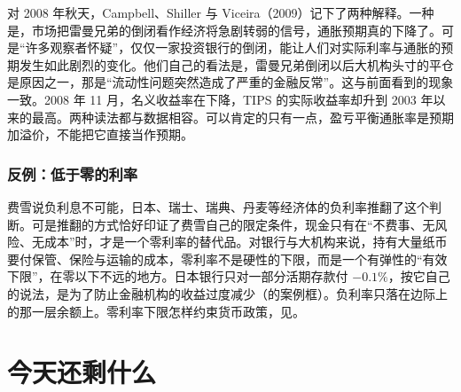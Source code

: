 对 2008 年秋天，Campbell、Shiller 与 Viceira（2009）记下了两种解释。一种是，市场把雷曼兄弟的倒闭看作经济将急剧转弱的信号，通胀预期真的下降了。可是“许多观察者怀疑”，仅仅一家投资银行的倒闭，能让人们对实际利率与通胀的预期发生如此剧烈的变化。他们自己的看法是，雷曼兄弟倒闭以后大机构头寸的平仓是原因之一，那是“流动性问题突然造成了严重的金融反常”\cite{csv2009}。这与前面看到的现象一致。2008 年 11 月，名义收益率在下降，TIPS 的实际收益率却升到 2003 年以来的最高。两种读法都与数据相容。可以肯定的只有一点，盈亏平衡通胀率是预期加溢价，不能把它直接当作预期。

\subsubsection{反例：低于零的利率}
费雪说负利息不可能，日本、瑞士、瑞典、丹麦等经济体的负利率推翻了这个判断。可是推翻的方式恰好印证了费雪自己的限定条件，现金只有在“不费事、无风险、无成本”时，才是一个零利率的替代品。对银行与大机构来说，持有大量纸币要付保管、保险与运输的成本，零利率不是硬性的下限，而是一个有弹性的“有效下限”，在零以下不远的地方。日本银行只对一部分活期存款付 $-0.1\%$，按它自己的说法，是为了防止金融机构的收益过度减少（的案例框）。负利率只落在边际上的那一层余额上。零利率下限怎样约束货币政策，见。

\section{今天还剩什么}\label{sec:prices-legacy}

